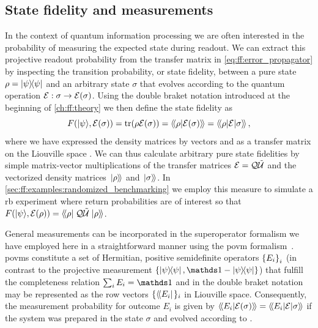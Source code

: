 \subsection{State fidelity and measurements}\label{subsec:ff:theory:derived_quantities:state_fidelity-measurements}
In the context of quantum information processing we are often interested in the probability of measuring the expected state during readout.
We can extract this projective readout probability from the transfer matrix in \cref{eq:ff:error_propagator} by inspecting the transition probability, or state fidelity, between a pure state $\rho = \op{\psi}$ and an arbitrary state $\sigma$ that evolves according to the quantum operation $\mathcal{E}: \sigma\rightarrow\mathcal{E}(\sigma)$.
Using the double braket notation introduced at the beginning of \cref{ch:ff:theory} we then define the state fidelity as
\begin{equation}\label{eq:ff:fidelity:state}
        \fid(\kpsi, \qp(\sigma)) = \tr(\rho\qp(\sigma)) = \dip{\rho}{\qp(\sigma)} = \dmel{\rho}{\qp}{\sigma},
\end{equation}
where we have expressed the density matrices by vectors and \qp as a transfer matrix on the Liouville space \Lspace.
We can thus calculate arbitrary pure state fidelities by simple matrix-vector multiplications of the transfer matrices $\mathcal{E} = \mathcal{Q}\mathcal{\tilde{U}}$ and the vectorized density matrices $\dket{\rho}$ and $\dket{\sigma}$.
In \cref{sec:ff:examples:randomized_benchmarking} we employ this measure to simulate a \gls{rb} experiment where return probabilities are of interest so that $\fid(\kpsi, \qp(\rho)) = \dbra{\rho}\liouvQ\liouvUe\dket{\rho}$.

General measurements can be incorporated in the superoperator formalism we have employed here in a straightforward manner using the \gls{povm} formalism~\cite{Wallman2014,Greenbaum2015}.
\Glspl{povm} constitute a set of Hermitian, positive semidefinite operators $\left\lbrace {E}_{i}\right\rbrace_{i}$ (in contrast to the projective measurement $\lbrace\op{\psi}{\psi},\eye - \op{\psi}{\psi}\rbrace$) that fulfill the completeness relation $\sum_i E_i = \eye$ and in the double braket notation may be represented as the row vectors $\lbrace\dbra{E_i}\rbrace_i$ in Liouville space.
Consequently, the measurement probability for outcome $E_i$ is given by $\dip{E_i}{\qp(\sigma)} = \dmel{E_i}{\qp}{\sigma}$ if the system was prepared in the state $\sigma$ and evolved according to \qp.

